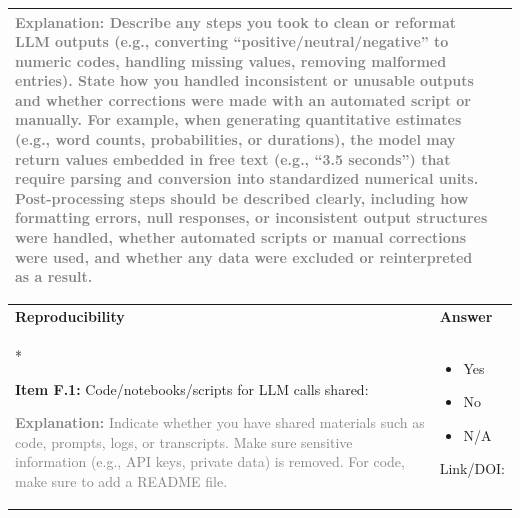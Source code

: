 \documentclass[12pt]{article}
\newcommand{\unchecked}{\ding{111}} %
\begin{document}
\begin{longtable}{|p{}|p{}|}
\textcolor{gray}{{\footnotesize
\textbf{Explanation:} Describe any steps you took to clean or reformat LLM outputs (e.g., converting “positive/neutral/negative” to numeric codes, handling missing values, removing malformed entries). State how you handled inconsistent or unusable outputs and whether corrections were made with an automated script or manually. For example, when generating quantitative estimates (e.g., word counts, probabilities, or durations), the model may return values embedded in free text (e.g., “3.5 seconds”) that require parsing and conversion into standardized numerical units. Post-processing steps should be described clearly, including how formatting errors, null responses, or inconsistent output structures were handled, whether automated scripts or manual corrections were used, and whether any data were excluded or reinterpreted as a result. 
}}
& \\
\hline
\end{longtable}

\begin{longtable}{|p{}|p{}|}
\hline
\rowcolor{green!20}
\textbf{{Reproducibility}} & \textbf{Answer} \\*   %
\hline

\textbf{Item F.1:} Code/notebooks/scripts for LLM calls shared:

\textcolor{gray}{{\footnotesize
\textbf{Explanation:} Indicate whether you have shared materials such as code, prompts, logs, or transcripts. Make sure sensitive information (e.g., API keys, private data) is removed. For code, make sure to add a README file. 
}}
& 
\begin{itemize}[leftmargin=*]\setlength{\itemsep}{0pt}\setlength{\parskip}{0pt}
    \item[\unchecked] Yes
    \item[\unchecked] No
    \item[\unchecked] N/A
\end{itemize} 

Link/DOI: \\
\hline
\end{longtable}
\end{document}
